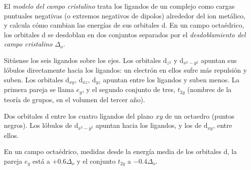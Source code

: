 \begin{definition}\label{def:b2:ligand-field:crystal-field}
El \emph{modelo del campo cristalino} trata los ligandos de un
complejo como cargas puntuales negativas (o extremos negativos de dipolos) alrededor del ion
metálico, y calcula cómo cambian las energías de sus orbitales d. En un campo
octaédrico, los orbitales d se desdoblan en dos conjuntos separados por el \emph{desdoblamiento del campo
cristalino} $\Delta_o$.
\end{definition}

Sitúense los seis ligandos sobre los ejes. Los orbitales $\mathrm d_{z^2}$ y $\mathrm d_{x^2-y^2}$
apuntan sus lóbulos directamente hacia los ligandos: un electrón en ellos sufre más repulsión
y suben. Los orbitales $\mathrm d_{xy}$, $\mathrm d_{xz}$, $\mathrm d_{yz}$ apuntan entre
los ligandos y suben menos. La primera pareja se llama $e_g$, y el segundo conjunto de tres,
$t_{2g}$ (nombres de la teoría de grupos, en el volumen del tercer año).

\begin{omfigure}

{\small Dos orbitales d entre los cuatro ligandos del plano $xy$ de un octaedro
(puntos negros). Los lóbulos de $\mathrm d_{x^2-y^2}$ apuntan hacia los ligandos, y los de
$\mathrm d_{xy}$, entre ellos.}
\end{omfigure}

\begin{theorem}[Baricentro]\label{thm:b2:ligand-field:barycentre}
En un campo octaédrico, medidas desde la energía media de los orbitales d, la
pareja $e_g$ está a $+0.6\Delta_o$ y el conjunto $t_{2g}$ a $-0.4\Delta_o$.
\end{theorem}

